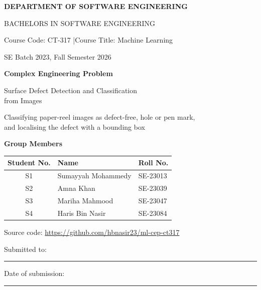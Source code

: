 \documentclass[11pt,a4paper]{report}
\newcommand{\repo}{\url{https://github.com/hbnasir23/ml-cep-ct317}}
\begin{document}
\begin{titlepage}
\centering
{\Large\bfseries DEPARTMENT OF SOFTWARE ENGINEERING\par}
\vspace{2pt}
{\large BACHELORS IN SOFTWARE ENGINEERING\par}
\vspace{1.2cm}
{\large Course Code: CT-317 \quad|\quad Course Title: Machine Learning\par}
\vspace{4pt}
{\large SE Batch 2023, Fall Semester 2026\par}
\vspace{2cm}
{\Huge\bfseries Complex Engineering Problem\par}
\vspace{0.5cm}
{\LARGE Surface Defect Detection and Classification\\[4pt] from Images\par}
\vspace{0.3cm}
{\large Classifying paper-reel images as defect-free, hole or pen mark,\\
and localising the defect with a bounding box\par}
\vspace{2cm}
{\large\bfseries Group Members\par}
\vspace{6pt}
\renewcommand{\arraystretch}{1.6}
\begin{tabular}{|c|p{7.5cm}|p{3.5cm}|}
\hline
\textbf{Student No.} & \textbf{Name} & \textbf{Roll No.}\\ \hline
S1 & Sumayyah Mohammedy & SE-23013\\ \hline
S2 & Amna Khan & SE-23039\\ \hline
S3 & Mariha Mahmood & SE-23047\\ \hline
S4 & Haris Bin Nasir & SE-23084\\ \hline
\end{tabular}
\vspace{1cm}

{\large Source code: \repo\par}
\vfill
{\large Submitted to: \rule{6cm}{0.4pt}\par}
\vspace{8pt}
{\large Date of submission: \rule{4cm}{0.4pt}\par}
\end{titlepage}
\end{document}
